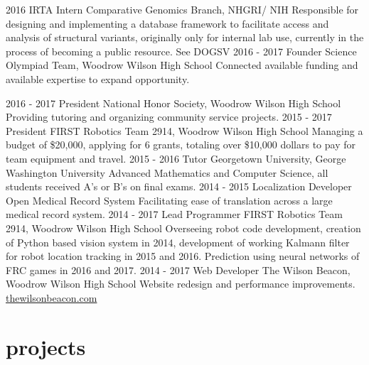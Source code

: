 \documentclass[]{cv}
\begin{document}
\begin{entrylist}
  \entry
    {2016}
    {IRTA Intern}
    {Comparative Genomics Branch, NHGRI/ NIH}
    {Responsible for designing and implementing a database framework to facilitate access and analysis of structural variants, originally only for internal lab use, currently in the process of becoming a public resource. See DOGSV}
  \entry
    {2016 - 2017}
    {Founder}
    {Science Olympiad Team, Woodrow Wilson High School}
    {Connected available funding and available expertise to expand opportunity.}

  \entry
    {2016 - 2017}
    {President}
    {National Honor Society, Woodrow Wilson High School}
    {Providing tutoring and organizing community service projects.}
  \entry
    {2015 - 2017}
    {President}
    {FIRST Robotics Team 2914, Woodrow Wilson High School}
    {Managing a budget of \$20,000, applying for 6 grants, totaling over \$10,000 dollars to pay for team equipment and travel.}
  \entry
    {2015 - 2016}
    {Tutor}
    {Georgetown University, George Washington University}
    {Advanced Mathematics and Computer Science, all students received A's or B's on final exams.}
  \entry
    {2014 - 2015}
    {Localization Developer}
    {Open Medical Record System}
    {Facilitating ease of translation across a large medical record system.}
  \entry
    {2014 - 2017}
    {Lead Programmer}
    {FIRST Robotics Team 2914, Woodrow Wilson High School}
    {Overseeing robot code development, creation of Python based vision system in 2014, development of working Kalmann filter for robot location tracking in 2015 and 2016. Prediction using neural networks of FRC games in 2016 and 2017.}
  \entry
    {2014 - 2017}
    {Web Developer}
    {The Wilson Beacon, Woodrow Wilson High School}
    {Website redesign and performance improvements. \href{http://thewilsonbeacon.com}{thewilsonbeacon.com}}
\end{entrylist}


\section{projects}
\end{document}
